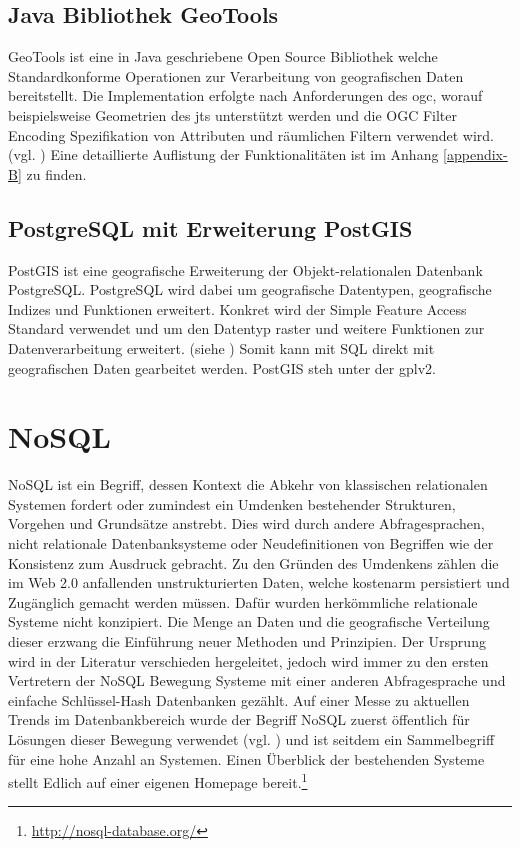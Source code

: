 
\subsection{Java Bibliothek GeoTools}
\label{geotools}
GeoTools ist eine in Java geschriebene Open Source Bibliothek welche Standardkonforme Operationen zur Verarbeitung von geografischen Daten bereitstellt.
Die Implementation erfolgte nach Anforderungen des \Gls{ogc}, worauf beispielsweise Geometrien des \Gls{jts} unterstützt werden und die OGC Filter Encoding Spezifikation von Attributen und räumlichen Filtern verwendet wird.(vgl. \cite{website:geotools})
Eine detaillierte Auflistung der Funktionalitäten ist im Anhang \ref{appendix-B} zu finden.

\subsection{PostgreSQL mit Erweiterung PostGIS}
PostGIS ist eine geografische Erweiterung der Objekt-relationalen Datenbank PostgreSQL.
PostgreSQL wird dabei um geografische Datentypen, geografische Indizes und Funktionen erweitert.
Konkret wird der Simple Feature Access Standard verwendet und um den Datentyp raster und weitere Funktionen zur Datenverarbeitung erweitert. (siehe \cite{website:postgisdocu-opengis})
Somit kann mit SQL direkt mit geografischen Daten gearbeitet werden.
PostGIS steh unter der \Gls{gpl}v2.


\section{NoSQL}
\label{nosql}

NoSQL ist ein Begriff, dessen Kontext die Abkehr von klassischen relationalen Systemen fordert oder zumindest ein Umdenken bestehender Strukturen, Vorgehen und Grundsätze anstrebt.
Dies wird durch andere Abfragesprachen, nicht relationale Datenbanksysteme oder Neudefinitionen von Begriffen wie der Konsistenz zum Ausdruck gebracht.
Zu den Gründen des Umdenkens zählen die im Web 2.0 anfallenden unstrukturierten Daten, welche kostenarm persistiert und Zugänglich gemacht werden müssen.
Dafür wurden herkömmliche relationale Systeme nicht konzipiert.
Die Menge an Daten und die geografische Verteilung dieser erzwang die Einführung neuer Methoden und Prinzipien.
Der Ursprung wird in der Literatur verschieden hergeleitet, jedoch wird immer zu den ersten Vertretern der NoSQL Bewegung Systeme mit einer anderen Abfragesprache und einfache Schlüssel-Hash Datenbanken gezählt.
Auf einer Messe zu aktuellen Trends im Datenbankbereich wurde der Begriff NoSQL zuerst öffentlich für Lösungen dieser Bewegung verwendet (vgl. \cite{website:originnosql}) und ist seitdem ein Sammelbegriff für eine hohe Anzahl an Systemen.
Einen Überblick der bestehenden Systeme stellt Edlich auf einer eigenen Homepage bereit.\footnote{\url{http://nosql-database.org/}}

